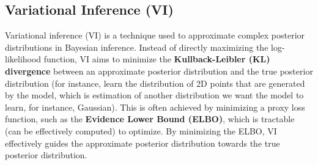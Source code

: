 \subsection{Variational Inference (VI)}
\label{appendix:variational_inference}

Variational inference (VI) is a technique used to approximate complex posterior distributions in Bayesian inference. Instead of directly maximizing the log-likelihood function, VI aims to minimize the \textbf{Kullback-Leibler (KL) divergence} between an approximate posterior distribution and the true posterior distribution (for instance, learn the distribution of 2D points that are generated by the model, which is estimation of another distribution we want the model to learn, for instance, Gaussian). This is often achieved by minimizing a proxy loss function, such as the \textbf{Evidence Lower Bound (ELBO)}, which is tractable (can be effectively computed) to optimize. By minimizing the ELBO, VI effectively guides the approximate posterior distribution towards the true posterior distribution.